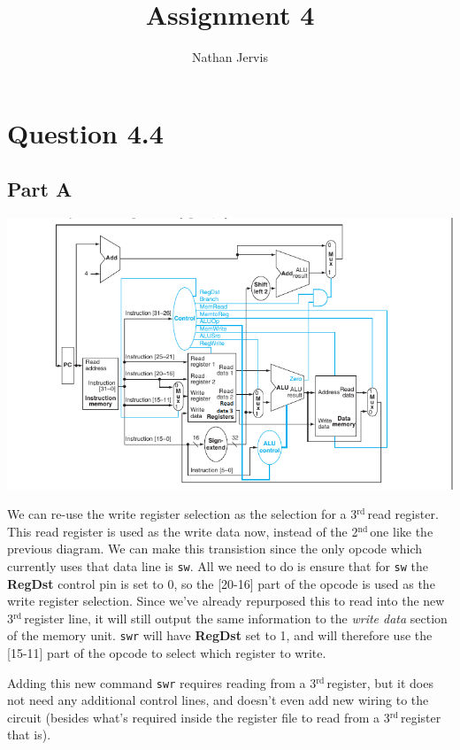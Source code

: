 \documentclass[11pt]{article} %
\title{Assignment 4}
\author{Nathan Jervis}
\newcommand{\strong}[1]{\textbf{#1}}
\newcommand{\code}[1]{\texttt{#1}}
\newcommand{\nd}{$^{\text{nd}\ }$}
\newcommand{\rd}{$^{\text{rd}\ }$}
\begin{document}
\maketitle

\section{Question 4.4}

\subsection{Part A}

\includegraphics[width=\textwidth]{CPU3.png}

We can re-use the write register selection as the selection for a 3\rd read register. This read register is used as the write data now, instead of the 2\nd one like the previous diagram. We can make this transistion since the only opcode which currently uses that data line is \code{sw}. All we need to do is ensure that for \code{sw} the \strong{RegDst} control pin is set to 0, so the [20-16] part of the opcode is used as the write register selection. Since we've already repurposed this to read into the new 3\rd register line, it will still output the same information to the \emph{write data} section of the memory unit. \code{swr} will have \strong{RegDst} set to 1, and will therefore use the [15-11] part of the opcode to select which register to write.

Adding this new command \code{swr} requires reading from a 3\rd register, but it does not need any additional control lines, and doesn't even add new wiring to the circuit (besides what's required inside the register file to read from a 3\rd register that is). 
\end{document}
